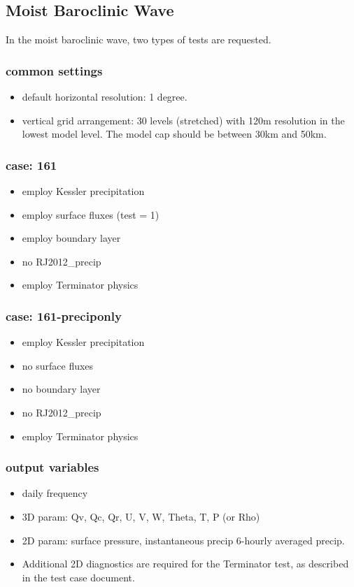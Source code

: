 \documentclass[a4paper]{article}
\begin{document}
\subsection{Moist Baroclinic Wave}
In the moist baroclinic wave, two types of tests are requested.

\subsubsection{common settings}
 \begin{itemize}
   \item default horizontal resolution: 1 degree.
   \item vertical grid arrangement: 30 levels (stretched)
   with 120m resolution in the lowest model level.
   The model cap should be between 30km and 50km.
 \end{itemize}

\subsubsection{case: 161}
 \begin{itemize}
   \item employ Kessler precipitation
   \item employ surface fluxes (test = 1)
   \item employ boundary layer
   \item no RJ2012\_precip
   \item employ Terminator physics
 \end{itemize}

\subsubsection{case: 161-preciponly}
 \begin{itemize}
   \item employ Kessler precipitation
   \item no surface fluxes
   \item no boundary layer
   \item no RJ2012\_precip
   \item employ Terminator physics
 \end{itemize}

\subsubsection{output variables}
 \begin{itemize}
   \item daily frequency
   \item 3D param: Qv, Qc, Qr, U, V, W, Theta, T, P (or Rho)
   \item 2D param: surface pressure, instantaneous precip 6-hourly averaged precip.
   \item Additional 2D diagnostics are required for the Terminator test,
         as described in the test case document.  
 \end{itemize}
\end{document}
